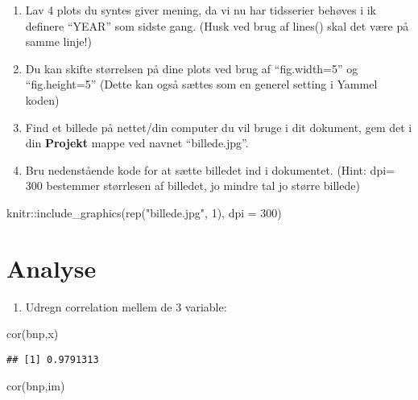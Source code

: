\documentclass[
  12pt,
]{article}
\newenvironment{Shaded}{\begin{snugshade}}{\end{snugshade}}
\newcommand{\AttributeTok}[1]{\textcolor[rgb]{0.77,0.63,0.00}{#1}}
\newcommand{\DecValTok}[1]{\textcolor[rgb]{0.00,0.00,0.81}{#1}}
\newcommand{\FunctionTok}[1]{\textcolor[rgb]{0.00,0.00,0.00}{#1}}
\newcommand{\NormalTok}[1]{#1}
\newcommand{\SpecialCharTok}[1]{\textcolor[rgb]{0.00,0.00,0.00}{#1}}
\newcommand{\StringTok}[1]{\textcolor[rgb]{0.31,0.60,0.02}{#1}}
\providecommand{\tightlist}{%
  \setlength{\itemsep}{0pt}\setlength{\parskip}{0pt}}
\begin{document}
\begin{enumerate}
\def\labelenumi{\arabic{enumi}.}
\item
  Lav 4 plots du syntes giver mening, da vi nu har tidsserier behøves i
  ik definere ``YEAR'' som sidste gang. (Husk ved brug af lines() skal
  det være på samme linje!)
\item
  Du kan skifte størrelsen på dine plots ved brug af ``fig.width=5'' og
  ``fig.height=5'' (Dette kan også sættes som en generel setting i
  Yammel koden)
\item
  Find et billede på nettet/din computer du vil bruge i dit dokument,
  gem det i din \textbf{Projekt} mappe ved navnet ``billede.jpg''.
\item
  Bru nedenstående kode for at sætte billedet ind i dokumentet. (Hint:
  dpi= 300 bestemmer størrlesen af billedet, jo mindre tal jo større
  billede)
\end{enumerate}

\begin{Shaded}
\begin{Highlighting}[]
\NormalTok{knitr}\SpecialCharTok{::}\FunctionTok{include\_graphics}\NormalTok{(}\FunctionTok{rep}\NormalTok{(}\StringTok{"billede.jpg"}\NormalTok{, }\DecValTok{1}\NormalTok{), }\AttributeTok{dpi =} \DecValTok{300}\NormalTok{)}
\end{Highlighting}
\end{Shaded}

\hypertarget{analyse}{%
\section{Analyse}\label{analyse}}

\begin{enumerate}
\def\labelenumi{\arabic{enumi}.}
\tightlist
\item
  Udregn correlation mellem de 3 variable:
\end{enumerate}

\begin{Shaded}
\begin{Highlighting}[]
\FunctionTok{cor}\NormalTok{(bnp,x)}
\end{Highlighting}
\end{Shaded}

\begin{verbatim}
## [1] 0.9791313
\end{verbatim}

\begin{Shaded}
\begin{Highlighting}[]
\FunctionTok{cor}\NormalTok{(bnp,im)}
\end{Highlighting}
\end{Shaded}
\end{document}
